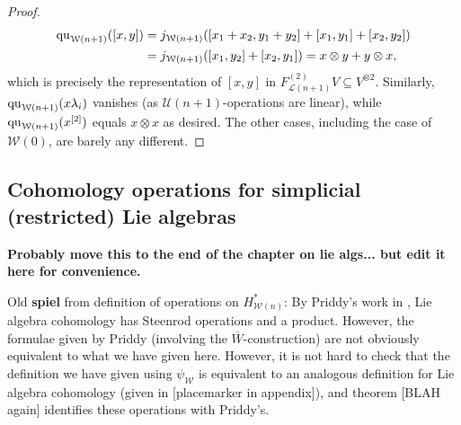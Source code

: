 \documentclass[11pt]{amsart}
\theoremstyle{plain}
\theoremstyle{definition}
\newcommand{\calW}{\mathcal{W}}
\newcommand{\calU}{\mathcal{U}}
\newcommand{\calL}{\mathcal{L}}
\theoremstyle{plain}
\newcommand{\restn}[1]{#1^{[2]}}
\newcommand{\quadratic}{\textup{qu}}
\begin{document}
\begin{homotopy operations for PRLs}
\begin{proof}
\begin{alignat*}{2}
\quadratic_{\calW(n+1)}([x,y])&=j_{\calW(n+1)}([{x_1}+{{x_2}},{y_1}+{{y_2}}]+[{x_1},{y_1}]+[{{x_2}},{{y_2}}])\\
&=j_{\calW(n+1)}([{x_1},{{y_2}}]+[{{x_2}},{y_1}])=x\otimes y+y\otimes x,
\end{alignat*}
which is precisely the representation of $[x,y]$ in $F^{(2)}_{\calL(n+1)}V\subseteq V^{\otimes2}$. Similarly, $\quadratic_{\calW(n+1)}(x\lambda_i)$ vanishes (as $\calU(n+1)$-operations are linear), while $\quadratic_{\calW(n+1)}(\restn{x})$ equals $x\otimes x$ as desired. The other cases, including the case of $\calW(0)$, are barely any different.
\end{proof}

\subsection{Cohomology operations for simplicial (restricted) Lie algebras}\label{section: Cohomology operations for simplicial (restricted) Lie algebras}

\textbf{Probably move this to the end of the chapter on lie algs... but edit it here for convenience.}

Old \textbf{spiel} from definition of operations on $H^*_{\calW(n)}$:
By Priddy's work in \cite{PriddySimplicialLie.pdf}, Lie algebra cohomology has Steenrod operations and a product. However, the formulae given by Priddy (involving the $\overline{W}$-construction) are not obviously equivalent to what we have given here. However, it is not hard to check that the definition we have given using $\psi_\calW$ is equivalent to an analogous definition for Lie algebra cohomology (given in [placemarker in appendix]), and theorem [BLAH again] identifies these operations with Priddy's.


\end{homotopy operations for PRLs}
\end{document}
